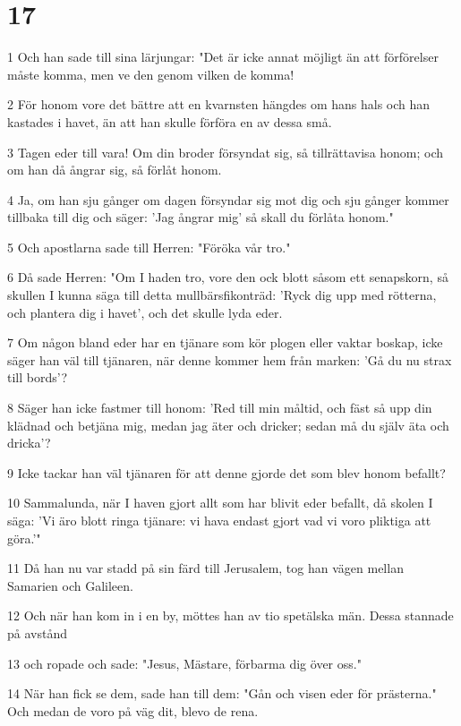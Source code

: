 \chapter{17}

\par 1 Och han sade till sina lärjungar: "Det är icke annat möjligt än att förförelser måste komma, men ve den genom vilken de komma!
\par 2 För honom vore det bättre att en kvarnsten hängdes om hans hals och han kastades i havet, än att han skulle förföra en av dessa små.
\par 3 Tagen eder till vara! Om din broder försyndat sig, så tillrättavisa honom; och om han då ångrar sig, så förlåt honom.
\par 4 Ja, om han sju gånger om dagen försyndar sig mot dig och sju gånger kommer tillbaka till dig och säger: 'Jag ångrar mig' så skall du förlåta honom."
\par 5 Och apostlarna sade till Herren: "Föröka vår tro."
\par 6 Då sade Herren: "Om I haden tro, vore den ock blott såsom ett senapskorn, så skullen I kunna säga till detta mullbärsfikonträd: 'Ryck dig upp med rötterna, och plantera dig i havet', och det skulle lyda eder.
\par 7 Om någon bland eder har en tjänare som kör plogen eller vaktar boskap, icke säger han väl till tjänaren, när denne kommer hem från marken: 'Gå du nu strax till bords'?
\par 8 Säger han icke fastmer till honom: 'Red till min måltid, och fäst så upp din klädnad och betjäna mig, medan jag äter och dricker; sedan må du själv äta och dricka'?
\par 9 Icke tackar han väl tjänaren för att denne gjorde det som blev honom befallt?
\par 10 Sammalunda, när I haven gjort allt som har blivit eder befallt, då skolen I säga: 'Vi äro blott ringa tjänare: vi hava endast gjort vad vi voro pliktiga att göra.'"
\par 11 Då han nu var stadd på sin färd till Jerusalem, tog han vägen mellan Samarien och Galileen.
\par 12 Och när han kom in i en by, möttes han av tio spetälska män. Dessa stannade på avstånd
\par 13 och ropade och sade: "Jesus, Mästare, förbarma dig över oss."
\par 14 När han fick se dem, sade han till dem: "Gån och visen eder för prästerna." Och medan de voro på väg dit, blevo de rena.
